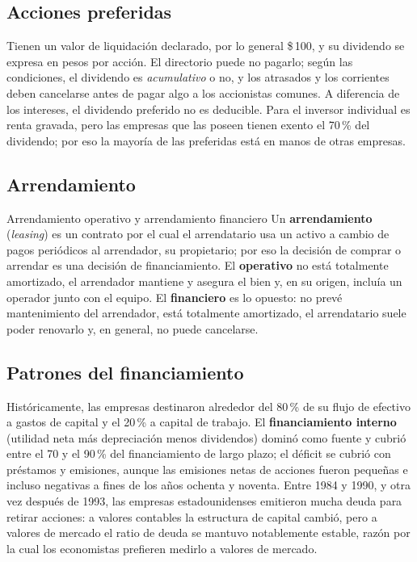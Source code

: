 \subsection{Acciones preferidas}

Tienen un valor de liquidación declarado, por lo general \$\,100, y su dividendo se expresa en pesos por acción. El directorio puede no pagarlo; según las condiciones, el dividendo es \emph{acumulativo} o no, y los atrasados y los corrientes deben cancelarse antes de pagar algo a los accionistas comunes. A diferencia de los intereses, el dividendo preferido no es deducible. Para el inversor individual es renta gravada, pero las empresas que las poseen tienen exento el 70\,\% del dividendo; por eso la mayoría de las preferidas está en manos de otras empresas.

\subsection{Arrendamiento}

\begin{definicion}{Arrendamiento operativo y arrendamiento financiero}
Un \textbf{arrendamiento} (\emph{leasing}) es un contrato por el cual el arrendatario usa un activo a cambio de pagos periódicos al arrendador, su propietario; por eso la decisión de comprar o arrendar es una decisión de financiamiento. El \textbf{operativo} no está totalmente amortizado, el arrendador mantiene y asegura el bien y, en su origen, incluía un operador junto con el equipo. El \textbf{financiero} es lo opuesto: no prevé mantenimiento del arrendador, está totalmente amortizado, el arrendatario suele poder renovarlo y, en general, no puede cancelarse.
\end{definicion}

\subsection{Patrones del financiamiento}

Históricamente, las empresas destinaron alrededor del 80\,\% de su flujo de efectivo a gastos de capital y el 20\,\% a capital de trabajo. El \textbf{financiamiento interno} (utilidad neta más depreciación menos dividendos) dominó como fuente y cubrió entre el 70 y el 90\,\% del financiamiento de largo plazo; el déficit se cubrió con préstamos y emisiones, aunque las emisiones netas de acciones fueron pequeñas e incluso negativas a fines de los años ochenta y noventa. Entre 1984 y 1990, y otra vez después de 1993, las empresas estadounidenses emitieron mucha deuda para retirar acciones: a valores contables la estructura de capital cambió, pero a valores de mercado el ratio de deuda se mantuvo notablemente estable, razón por la cual los economistas prefieren medirlo a valores de mercado.

